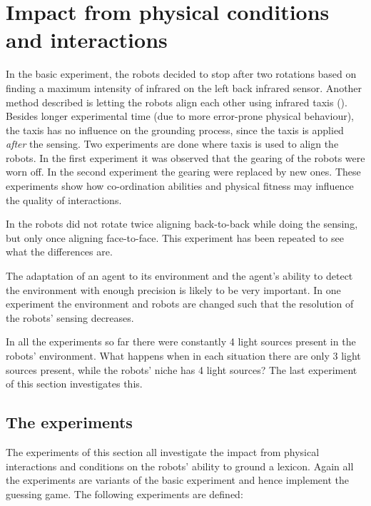 \section{Impact from physical conditions and interactions}\label{s:par:int}


In the basic experiment, the robots decided to stop after two rotations based on finding a maximum intensity of infrared on the left back infrared sensor. Another method described is letting the robots align each other using infrared taxis (). Besides longer experimental time (due to more error-prone physical behaviour), the taxis has no influence on the grounding process, since the taxis is applied {\em after} the sensing. Two experiments are done where taxis is used to align the robots. In the first experiment it was observed that the gearing of the robots were worn off. In the second experiment the gearing were replaced by new ones. These experiments show how co-ordination abilities and physical fitness may influence the quality of interactions.

In \citealt{steelsvogt:1997} the robots did not rotate twice aligning back-to-back while doing the sensing, but only once aligning face-to-face. This experiment has been repeated to see what the differences are.

The adaptation of an agent to its environment and the agent's ability to detect the environment with enough precision is likely to be very important. In one experiment the environment and robots are changed such that the resolution of the robots' sensing decreases.

In all the experiments so far there were constantly 4 light sources present in the robots' environment. What happens when in each situation there are only 3 light sources present, while the robots' niche has 4 light sources? The last experiment of this section investigates this.

\subsection{The experiments}

The experiments of this section all investigate the impact from physical interactions and conditions on the robots' ability to ground a lexicon. Again all the experiments are variants of the basic experiment and hence implement the guessing game. The following experiments are defined:

